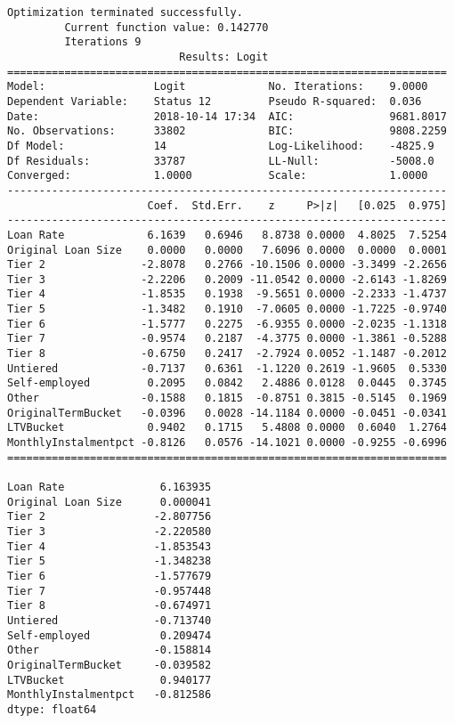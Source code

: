 \documentclass[11pt]{article}
\begin{document}
    \begin{Verbatim}[commandchars=\\\{\}]
Optimization terminated successfully.
         Current function value: 0.142770
         Iterations 9
                           Results: Logit
=====================================================================
Model:                 Logit             No. Iterations:    9.0000   
Dependent Variable:    Status 12         Pseudo R-squared:  0.036    
Date:                  2018-10-14 17:34  AIC:               9681.8017
No. Observations:      33802             BIC:               9808.2259
Df Model:              14                Log-Likelihood:    -4825.9  
Df Residuals:          33787             LL-Null:           -5008.0  
Converged:             1.0000            Scale:             1.0000   
---------------------------------------------------------------------
                      Coef.  Std.Err.    z     P>|z|   [0.025  0.975]
---------------------------------------------------------------------
Loan Rate             6.1639   0.6946   8.8738 0.0000  4.8025  7.5254
Original Loan Size    0.0000   0.0000   7.6096 0.0000  0.0000  0.0001
Tier 2               -2.8078   0.2766 -10.1506 0.0000 -3.3499 -2.2656
Tier 3               -2.2206   0.2009 -11.0542 0.0000 -2.6143 -1.8269
Tier 4               -1.8535   0.1938  -9.5651 0.0000 -2.2333 -1.4737
Tier 5               -1.3482   0.1910  -7.0605 0.0000 -1.7225 -0.9740
Tier 6               -1.5777   0.2275  -6.9355 0.0000 -2.0235 -1.1318
Tier 7               -0.9574   0.2187  -4.3775 0.0000 -1.3861 -0.5288
Tier 8               -0.6750   0.2417  -2.7924 0.0052 -1.1487 -0.2012
Untiered             -0.7137   0.6361  -1.1220 0.2619 -1.9605  0.5330
Self-employed         0.2095   0.0842   2.4886 0.0128  0.0445  0.3745
Other                -0.1588   0.1815  -0.8751 0.3815 -0.5145  0.1969
OriginalTermBucket   -0.0396   0.0028 -14.1184 0.0000 -0.0451 -0.0341
LTVBucket             0.9402   0.1715   5.4808 0.0000  0.6040  1.2764
MonthlyInstalmentpct -0.8126   0.0576 -14.1021 0.0000 -0.9255 -0.6996
=====================================================================

Loan Rate               6.163935
Original Loan Size      0.000041
Tier 2                 -2.807756
Tier 3                 -2.220580
Tier 4                 -1.853543
Tier 5                 -1.348238
Tier 6                 -1.577679
Tier 7                 -0.957448
Tier 8                 -0.674971
Untiered               -0.713740
Self-employed           0.209474
Other                  -0.158814
OriginalTermBucket     -0.039582
LTVBucket               0.940177
MonthlyInstalmentpct   -0.812586
dtype: float64

    \end{Verbatim}
\end{document}
